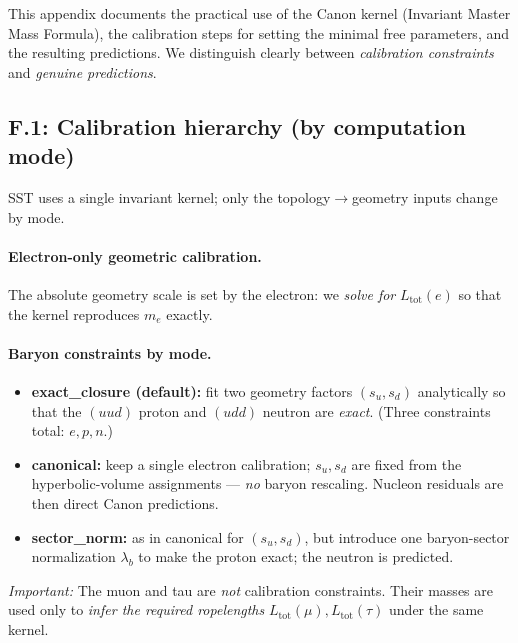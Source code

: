 \documentclass[11pt, preprint,titlepage]{revtex4-2}
\begin{document}
		This appendix documents the practical use of the Canon kernel (Invariant Master Mass Formula), the calibration steps for setting the minimal free parameters, and the resulting predictions. We distinguish clearly between \emph{calibration constraints} and \emph{genuine predictions}.

		\subsection*{F.1: Calibration hierarchy (by computation mode)}
		SST uses a single invariant kernel; only the topology\(\to\)geometry inputs change by mode.

		\paragraph{Electron-only geometric calibration.}
		The absolute geometry scale is set by the electron: we \emph{solve for} \(L_{\text{tot}}(e)\) so that the kernel reproduces \(m_e\) exactly.

		\paragraph{Baryon constraints by mode.}
		\begin{itemize}
		\item \textbf{exact\_closure (default):} fit two geometry factors \((s_u,s_d)\) analytically so that the \((uud)\) proton and \((udd)\) neutron are \emph{exact}. (Three constraints total: \(e,p,n\).)
		\item \textbf{canonical:} keep a single electron calibration; \(s_u,s_d\) are fixed from the hyperbolic-volume assignments — \emph{no} baryon rescaling. Nucleon residuals are then direct Canon predictions.
		\item \textbf{sector\_norm:} as in canonical for \((s_u,s_d)\), but introduce one baryon-sector normalization \(\lambda_b\) to make the proton exact; the neutron is predicted.
		\end{itemize}

		\emph{Important:} The muon and tau are \emph{not} calibration constraints. Their masses are used only to \emph{infer the required ropelengths} \(L_{\text{tot}}(\mu),L_{\text{tot}}(\tau)\) under the same kernel.
\end{document}
